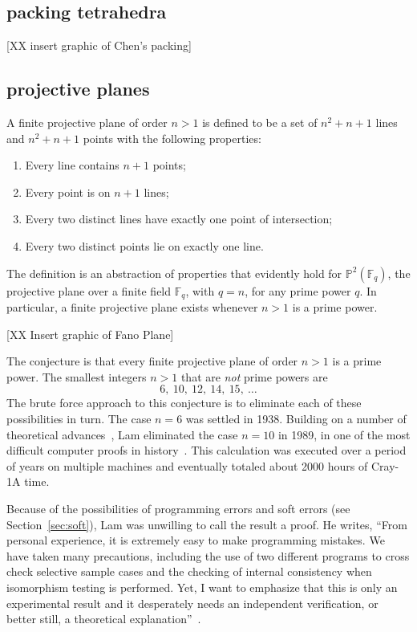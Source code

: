 \documentclass{llncs}
\newcommand{\ring}[1]{\mathbb{#1}}
\begin{document}

\subsection{packing  tetrahedra}


[XX insert graphic of Chen's packing]

\subsection{projective planes}

A finite projective plane of order $n>1$ is defined to be a set of
$n^2 + n + 1$ lines and $n^2 + n+ 1$ points with the following
properties:
\begin{enumerate}
\item Every line contains $n+1$ points;
\item Every point is on $n+1$ lines;
\item Every two distinct lines have exactly one point of intersection;
\item Every two distinct points lie on exactly one line.
\end{enumerate}

The definition is an abstraction of properties that evidently
hold for $\ring{P}^2(\ring{F}_q)$, the projective plane over a finite
field $\ring{F}_q$, with $q=n$, for any prime power $q$.  In
particular, a finite projective plane exists whenever $n>1$ is a prime
power.

[XX Insert graphic of Fano Plane]

The conjecture is that every finite projective plane
of order $n>1$ is a prime power.  The smallest integers $n>1$
that are {\it not} prime powers are
\[
6,~10,~12,~14,~15,~\dots
\]
The brute force approach to this conjecture is to eliminate each of
these possibilities in turn.  The case $n=6$ was settled in 1938.
Building on a number of theoretical advances~\cite{MST}, Lam eliminated the case
$n=10$ in 1989, in one of the most difficult computer proofs in
history~\cite{Lam89}.  This calculation was executed over
a period of years on multiple machines and eventually totaled about 2000
hours of Cray-1A time.  

Because of the possibilities of programming errors and soft errors
(see Section~\ref{sec:soft}), Lam was unwilling to call the result a
proof.  He writes, ``From personal experience, it is extremely easy to
make programming mistakes. We have taken many precautions, including
the use of two different programs to cross check selective sample
cases and the checking of internal consistency when isomorphism
testing is performed. Yet, I want to emphasize that this is only an
experimental result and it desperately needs an independent
verification, or better still, a theoretical
explanation''~\cite{LamS}.
\end{document}

